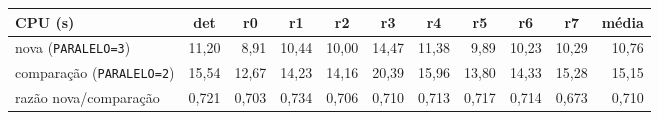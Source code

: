 \begin{tabular}{@{}l rrrrrrrrr r@{}}
\toprule
CPU (s) & \multicolumn{1}{c}{det} & \multicolumn{1}{c}{r0} & \multicolumn{1}{c}{r1} & \multicolumn{1}{c}{r2} & \multicolumn{1}{c}{r3} & \multicolumn{1}{c}{r4} & \multicolumn{1}{c}{r5} & \multicolumn{1}{c}{r6} & \multicolumn{1}{c}{r7} & média \\
\midrule
nova (\texttt{PARALELO=3}) & 11{,}20 & 8{,}91 & 10{,}44 & 10{,}00 & 14{,}47 & 11{,}38 & 9{,}89 & 10{,}23 & 10{,}29 & 10{,}76 \\
comparação (\texttt{PARALELO=2}) & 15{,}54 & 12{,}67 & 14{,}23 & 14{,}16 & 20{,}39 & 15{,}96 & 13{,}80 & 14{,}33 & 15{,}28 & 15{,}15 \\
razão nova/comparação & 0{,}721 & 0{,}703 & 0{,}734 & 0{,}706 & 0{,}710 & 0{,}713 & 0{,}717 & 0{,}714 & 0{,}673 & 0{,}710 \\
\bottomrule
\end{tabular}
